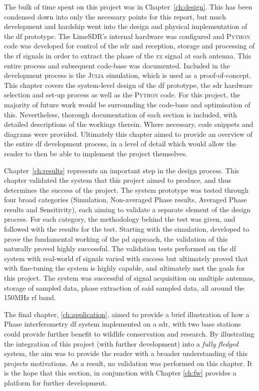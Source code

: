\documentclass[class=report,11pt,crop=false]{standalone}
\begin{document}
The bulk of time spent on this project was in Chapter~\ref{ch:design}. This has been condensed down into only the necessary points for this report, but much development and hardship went into the design and physical implementation of the \gls{df} prototype. The LimeSDR's internal hardware was configured and \textsc{Python} code was developed for control of the \gls{sdr} and reception, storage and processing of the \gls{rf} signals in order to extract the phase of the \gls{rx} signal at each antenna. This entire process and subsequent code-base was documented. Included in the development process is the \textsc{Julia} simulation, which is used as a proof-of-concept. This chapter covers the system-level design of the \gls{df} prototype, the \gls{sdr} hardware selection and set-up process as well as the \textsc{Python} code. For this project, the majority of future work would be surrounding the code-base and optimisation of this. Nevertheless, thorough documentation of each section is included, with detailed descriptions of the workings therein. Where necessary, code snippets and diagrams were provided. 
Ultimately this chapter aimed to provide an overview of the entire \gls{df} development process, in a level of detail which would allow the reader to then be able to implement the project themselves.

Chapter~\ref{ch:results} represents an important step in the design process. This chapter validated the system that this project aimed to produce, and thus determines the success of the project. The system prototype was tested through four broad categories (Simulation, Non-averaged Phase results, Averaged Phase results and Sensitivity), each aiming to validate a separate element of the design process. For each category, the methodology behind the test was given, and followed with the results for the test. Starting with the simulation, developed to prove the fundamental working of the \gls{pd} approach, the validation of this naturally proved highly successful. The validation tests performed on the \gls{df} system with real-world \gls{rf} signals varied with success but ultimately proved that with fine-tuning the system is highly capable, and ultimately met the goals for this project. The system was successful of signal acquisition on multiple antennas, storage of sampled data, phase extraction of said sampled data, all around the 150MHz \gls{rf} band.  

The final chapter, \ref{ch:application}, aimed to provide a brief illustration of how a Phase interferometry \gls{df} system implemented on a \gls{sdr}, with two base stations could provide further benefit to wildlife conservation and research. By illustrating the integration of this project (with further development) into a \emph{fully fledged} system, the aim was to provide the reader with a broader understanding of this projects motivations. As a result, no validation was performed on this chapter. It is the hope that this section, in conjunction with Chapter \ref{ch:fw} provides a platform for further development. 
\end{document}
